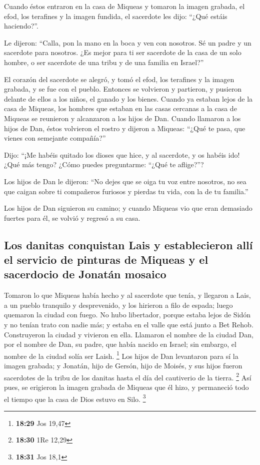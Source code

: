 Cuando éstos entraron en la casa de Miqueas y tomaron la
imagen grabada, el efod, los terafines y la imagen fundida, el sacerdote
les dijo: ``¿Qué estáis haciendo?''.

 Le dijeron: ``Calla, pon la mano en la boca y ven con
nosotros. Sé un padre y un sacerdote para nosotros. ¿Es mejor para ti
ser sacerdote de la casa de un solo hombre, o ser sacerdote de una tribu
y de una familia en Israel?''

 El corazón del sacerdote se alegró, y tomó el efod, los
terafines y la imagen grabada, y se fue con el pueblo. 
Entonces se volvieron y partieron, y pusieron delante de ellos a los
niños, el ganado y los bienes.  Cuando ya estaban lejos
de la casa de Miqueas, los hombres que estaban en las casas cercanas a
la casa de Miqueas se reunieron y alcanzaron a los hijos de Dan.
 Cuando llamaron a los hijos de Dan, éstos volvieron el
rostro y dijeron a Miqueas: ``¿Qué te pasa, que vienes con semejante
compañía?''

 Dijo: ``¡Me habéis quitado los dioses que hice, y al
sacerdote, y os habéis ido! ¿Qué más tengo? ¿Cómo puedes preguntarme:
``¿Qué te aflige?''?

 Los hijos de Dan le dijeron: ``No dejes que se oiga tu
voz entre nosotros, no sea que caigan sobre ti compañeros furiosos y
pierdas tu vida, con la de tu familia.''

 Los hijos de Dan siguieron su camino; y cuando Miqueas
vio que eran demasiado fuertes para él, se volvió y regresó a su casa.

\hypertarget{los-danitas-conquistan-lais-y-establecieron-alluxed-el-servicio-de-pinturas-de-miqueas-y-el-sacerdocio-de-jonatuxe1n-mosaico}{%
\subsection{Los danitas conquistan Lais y establecieron allí el servicio
de pinturas de Miqueas y el sacerdocio de Jonatán
mosaico}\label{los-danitas-conquistan-lais-y-establecieron-alluxed-el-servicio-de-pinturas-de-miqueas-y-el-sacerdocio-de-jonatuxe1n-mosaico}}

 Tomaron lo que Miqueas había hecho y al sacerdote que
tenía, y llegaron a Lais, a un pueblo tranquilo y desprevenido, y los
hirieron a filo de espada; luego quemaron la ciudad con fuego.
 No hubo libertador, porque estaba lejos de Sidón y no
tenían trato con nadie más; y estaba en el valle que está junto a Bet
Rehob. Construyeron la ciudad y vivieron en ella. 
Llamaron el nombre de la ciudad Dan, por el nombre de Dan, su padre, que
había nacido en Israel; sin embargo, el nombre de la ciudad solía ser
Laish. \footnote{\textbf{18:29} Jos 19,47}  Los hijos de
Dan levantaron para sí la imagen grabada; y Jonatán, hijo de Gersón,
hijo de Moisés, y sus hijos fueron sacerdotes de la tribu de los danitas
hasta el día del cautiverio de la tierra. \footnote{\textbf{18:30} 1Re
  12,29}  Así pues, se erigieron la imagen grabada de
Miqueas que él hizo, y permaneció todo el tiempo que la casa de Dios
estuvo en Silo. \footnote{\textbf{18:31} Jos 18,1}

